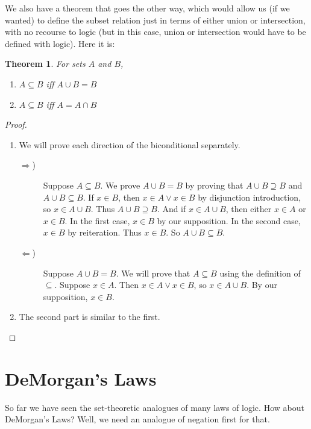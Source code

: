 \documentclass[12pt]{article}
\newcounter{thmc}
\newtheorem{thm}[thmc]{Theorem}
\begin{document}
We also have a theorem that goes the other way, which would allow us
(if we wanted) to define the subset relation just in terms of either
union or intersection, with no recourse to logic (but in this case,
union or intersection would have to be defined with logic).  Here it
is:

\begin{thm}\label{thm:relfromop}
  For sets $A$ and $B$,
  \begin{enumerate}[label=\alph*)]
  \item $A\subseteq B$ iff $A\cup B=B$
  \item $A\subseteq B$ iff $A=A\cap B$
  \end{enumerate}
\end{thm}
\begin{proof}
  \begin{enumerate}[label=\alph*)]
    \item We will prove each direction of the biconditional
      separately.
      \begin{description}
        \item[$\Rightarrow$)] Suppose $A\subseteq B$.  We prove $A\cup
          B=B$ by proving that $A\cup B \supseteq B$ and $A\cup
          B\subseteq B$.  If $x\in B$, then $x\in A\vee x\in B$ by
          disjunction introduction, so $x\in A\cup B$.  Thus $A\cup
          B\supseteq B$.  And if $x\in A\cup B$, then either $x\in A$
          or $x\in B$.  In the first case, $x\in B$ by our
          supposition.  In the second case, $x\in B$ by reiteration.
          Thus $x\in B$.  So $A\cup B\subseteq B$.
        \item[$\Leftarrow$)] Suppose $A\cup B=B$.  We will prove that
          $A\subseteq B$ using the definition of $\subseteq$.  Suppose
          $x\in A$.  Then $x\in A\vee x\in B$, so $x\in A\cup B$.  By
          our supposition, $x\in B$.
      \end{description}
    \item The second part is similar to the first.
  \end{enumerate}
\end{proof}

\section{DeMorgan's Laws}

So far we have seen the set-theoretic analogues of many laws of logic.
How about DeMorgan's Laws?  Well, we need an analogue of negation
first for that.
\end{document}

